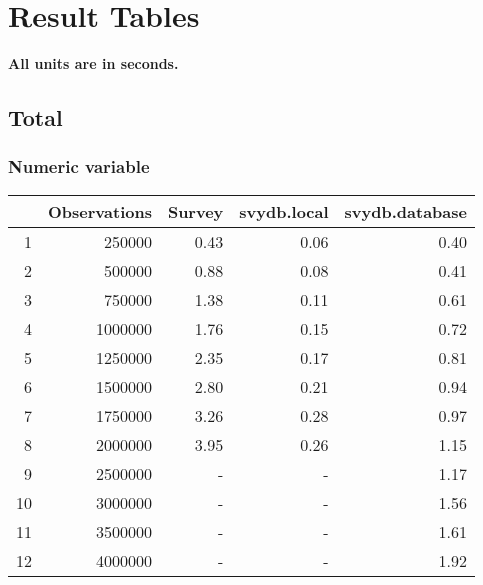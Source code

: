 
\chapter{Result Tables} \label{AppendixA}

{\bf All units are in seconds.}

\section{Total}
\subsection{Numeric variable}
\begin{table}[ht]
\centering
\begin{tabular}{rrrrr}
  \hline
 & Observations & Survey & svydb.local & svydb.database \\ 
  \hline
1 & 250000 & 0.43 & 0.06 & 0.40 \\ 
  2 & 500000 & 0.88 & 0.08 & 0.41 \\ 
  3 & 750000 & 1.38 & 0.11 & 0.61 \\ 
  4 & 1000000 & 1.76 & 0.15 & 0.72 \\ 
  5 & 1250000 & 2.35 & 0.17 & 0.81 \\ 
  6 & 1500000 & 2.80 & 0.21 & 0.94 \\ 
  7 & 1750000 & 3.26 & 0.28 & 0.97 \\ 
  8 & 2000000 & 3.95 & 0.26 & 1.15 \\ 
  9 & 2500000 & - & - & 1.17 \\ 
  10 & 3000000 & - & - & 1.56 \\ 
  11 & 3500000 & - & - & 1.61 \\ 
  12 & 4000000 & - & - & 1.92 \\ 
   \hline
\end{tabular}
\end{table}

